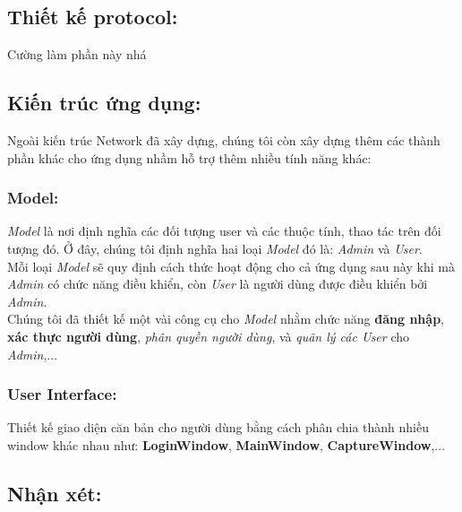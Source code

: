 \subsection{Thiết kế protocol: }

Cường làm phần này nhá


\subsection{Kiến trúc ứng dụng: }

Ngoài kiến trúc Network đã xây dựng, chúng tôi còn xây dựng thêm các thành phần khác cho ứng dụng nhầm hỗ trợ thêm nhiều tính năng khác:

\subsubsection{Model: }
\textit{Model} là nơi định nghĩa các đối tượng user và các thuộc tính, thao tác trên đối tượng đó. Ở đây, chúng tôi định nghĩa hai loại \textit{Model} đó là: \textit{Admin} và \textit{User}. \\
Mỗi loại \textit{Model} sẽ quy định cách thức hoạt động cho cả ứng dụng sau này khi mà \textit{Admin} có chức năng điều khiển, còn \textit{User} là người dùng được điều khiển bởi \textit{Admin}. \\
Chúng tôi đã thiết kế một vài công cụ cho \textit{Model} nhằm chức năng \textbf{đăng nhập}, \textbf{xác thực người dùng}, \textit{phân quyền người dùng}, và \textit{quãn lý các User} cho \textit{Admin},...


\subsubsection{User Interface: }
Thiết kế giao diện căn bản cho người dùng bằng cách phân chia thành nhiều window khác nhau như: \textbf{LoginWindow}, \textbf{MainWindow}, \textbf{CaptureWindow},...

\subsection{Nhận xét: }

